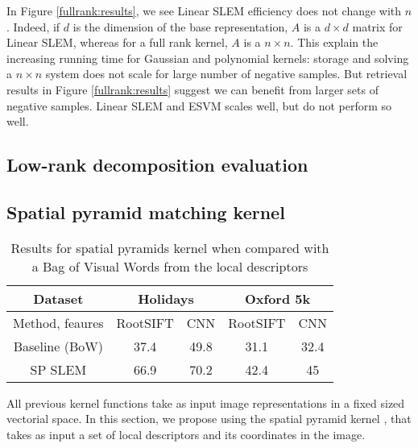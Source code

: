 In Figure \ref{fullrank:results}, we see Linear SLEM efficiency does not change with $n$.
Indeed, if $d$ is the dimension of the base representation, $A$ is a $d\times d$ matrix for Linear SLEM, whereas for a full rank kernel, $A$ is a $n\times n$.
This explain the increasing running time for Gaussian and polynomial kernels: storage and solving a $n\times n$ system does not scale for large number of negative samples.
But retrieval results in Figure \ref{fullrank:results} suggest we can benefit from larger sets of negative samples. Linear SLEM and ESVM scales well, but do not perform so well.

\vspace{3 mm}



\subsection{Low-rank decomposition evaluation}



\subsection{Spatial pyramid matching kernel}

\begin{table}[!h]
    \centering
    \caption{Results for spatial pyramids kernel when compared with a Bag of Visual Words from the local descriptors}
    \begin{tabular}{|c|c|c|c|c|}
    \hline
    Dataset & \multicolumn{2}{|c|}{\textbf{Holidays}} & \multicolumn{2}{|c|}{\textbf{Oxford 5k}}\\
    \hline
        Method, feaures & RootSIFT & CNN & RootSIFT
        &CNN \\
    \hline
    \hline
    Baseline (BoW) & 37.4 & 49.8 & 31.1 & 32.4 \\
        SP SLEM    & 66.9 & 70.2 & 42.4 & 45 \\
    \hline
    \end{tabular}
    \label{tab:spk}
\end{table}
All previous kernel functions take as input image representations in a fixed sized vectorial space. In this section, we propose using the spatial pyramid kernel \cite{GrauDa05}, that takes as input a set of local descriptors and its coordinates in the image.

